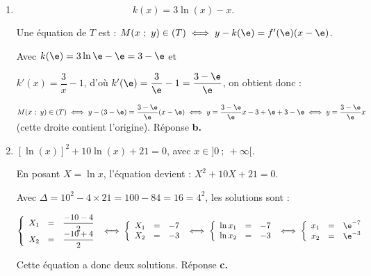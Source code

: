 \begin{enumerate}
$h'(x) = 4\e^{2x} + 2(4x - 16)\e^{2x} = \e^{2x}(4 + 8x - 32) = \e^{2x}(8x - 28)$.

$h''(x) = 8\e^{2x} + 2(8x - 28)\e^{2x} = \e^{2x}(8 + 16x  - 56) = \e^{2x}(16x - 48) = 16\e^{2x}(x - 3)$.

Comme $4\e^{2x} > 0$ quel que soit le réel $x$, le signe de $h''(x)$ est celui de $x - 3$.

Donc la dérivée seconde s'annule en $x = 3$ en changeant de signe, donc le point de coordonnées $\left(3~;~-4\text{e}^{6}\right)$ est le seul point d'inflexion de la courbe $\mathcal{C}_h$. Réponse \textbf{b.}

\item 
\[k(x) = 3 \ln (x) - x.\]





Une équation de $T$ est : $M(x~;~y) \in (T) \iff y - k(\e) = f'(\e)(x- \e)$.

Avec $k(\e) = 3\ln \e - \e = 3 - \e$ et 

$k'(x) = \dfrac 3x - 1$, d'où $k'(\e) = \dfrac{3}{\e} - 1 = \dfrac{3 - \e}{\e}$, on obtient donc :

$M(x~;~y) \in (T) \iff y - (3 - \e) = \dfrac{3 - \e}{\e}(x- \e) \iff y  = \dfrac{3 - \e}{\e}x - 3 + \e  + 3 - \e \iff y = \dfrac{3 - \e}{\e}x$ (cette droite contient l'origine). Réponse \textbf{b.}







\item 
$[\ln (x)]^2 + 10 \ln (x) + 21 = 0$, avec $x \in ]0~;~+\infty[$.







En posant $X = \ln x$, l'équation devient : $X^2 + 10X + 21 = 0$.

Avec $\Delta = 10^2 - 4\times 21 = 100 - 84 = 16 = 4^2$, les solutions sont :

$\left\{\begin{array}{l c l}
X_1 &=&\dfrac{-10 - 4}{2}\\
X_2&=&\dfrac{-10 + 4}{2}
\end{array}\right. \iff 
\left\{\begin{array}{l c l}
X_1 &=&- 7\\
X_2&=&- 3
\end{array}\right. \iff \left\{\begin{array}{l c l}
\ln x_1 &=&-7\\
\ln x_2&=&-3
\end{array}\right. \iff 
\left\{\begin{array}{l c l}
x_1 &=&\e^{-7}\\
x_2&=&\e^{-3}
\end{array}\right.$

Cette équation a donc deux solutions. Réponse \textbf{c.}
\end{enumerate}
